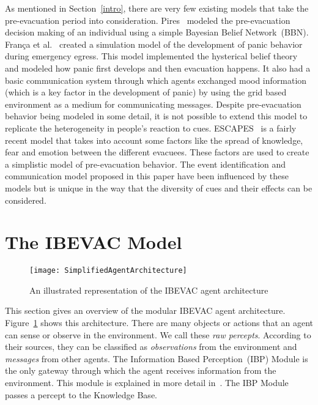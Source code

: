 As mentioned in Section~\ref{intro}, there are very few existing models that take the pre-evacuation period into consideration. Pires~\cite{Pires:2005gs}  modeled the pre-evacuation decision making of an individual using a simple Bayesian Belief Network~(BBN). Fran{\c c}a et al.~\cite{Franca:2009wq} created a simulation model of the development of panic behavior during emergency egress. This model implemented the hysterical belief theory~\cite{Torres:2010tj} and modeled how panic first develops and then evacuation happens. It also had a basic communication system through which agents exchanged mood information (which is a key factor in the development of panic) by using the grid based environment as a medium for communicating messages. Despite pre-evacuation behavior being modeled in some detail, it is not possible to extend this model to replicate the heterogeneity in people's reaction to cues. ESCAPES~\cite{Tsai:2011tz} is a fairly recent model that takes into account some factors like the spread of knowledge, fear and emotion between the different evacuees. These factors are used to create a simplistic model of pre-evacuation behavior. The event identification and communication model proposed in this paper have been influenced by these models but is unique in the way that the diversity of cues and their effects can be considered.

\section{The IBEVAC Model}
\label{IBEVAC}


\begin{figure}[!tb]
\centering
\texttt{[image: SimplifiedAgentArchitecture]}
\caption[The Agent Architecture]{An illustrated representation of the IBEVAC agent architecture}
\label{fig:AgentArchitecture}
\end{figure}

This section gives an overview of the modular IBEVAC agent architecture. Figure~\ref{fig:AgentArchitecture} shows this architecture. There are many objects or actions that an agent can sense or observe in the environment. We call these \emph{raw percepts}. According to their sources, they can be classified as \emph{observations} from the environment and \emph{messages} from other agents. The Information Based Perception~(IBP) Module is the only gateway through which the agent receives information from the environment. This module is explained in more detail in~\cite{Viswanathan:ut}. The IBP Module passes a percept to the Knowledge Base.

